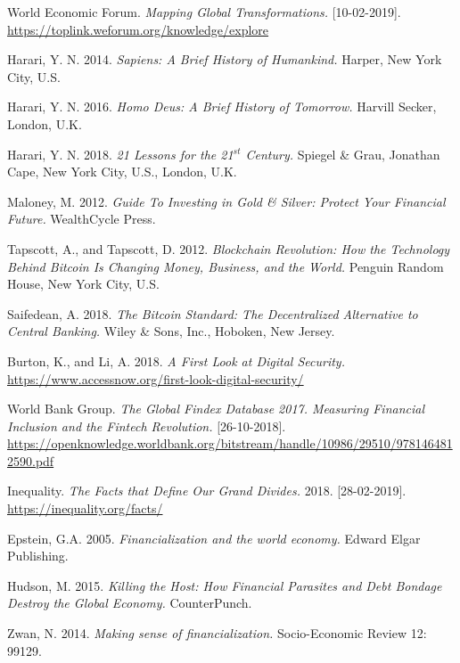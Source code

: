 \begin{thebibliography}{25}
World Economic Forum. \emph{Mapping Global Transformations.} [10-02-2019].\\ \url{https://toplink.weforum.org/knowledge/explore}

 Harari, Y. N. 2014. \emph{Sapiens: A Brief History of Humankind.} 
 Harper, New York City, U.S.

 Harari, Y. N. 2016. \emph{Homo Deus: A Brief History of Tomorrow.}
 Harvill Secker, London, U.K.

 Harari, Y. N. 2018. \emph{21 Lessons for the 21$^{st}$ Century.}
 Spiegel \& Grau, Jonathan Cape, New York City, U.S., London, U.K.

 Maloney, M. 2012. \emph{Guide To Investing in Gold \& Silver: Protect Your Financial Future.}
 WealthCycle Press.

 Tapscott, A., and Tapscott, D. 2012. \emph{Blockchain Revolution: How the Technology Behind Bitcoin Is Changing Money, Business, and the World.} Penguin Random House, New York City, U.S.

 Saifedean, A. 2018. \emph{The Bitcoin Standard: The Decentralized Alternative to Central Banking.}
 Wiley \& Sons, Inc., Hoboken, New Jersey.

Burton, K., and Li, A. 2018. \emph{A First Look at Digital Security.}\\ \url{https://www.accessnow.org/first-look-digital-security/}

World Bank Group. \emph{The Global Findex Database 2017. Measuring Financial Inclusion and the Fintech Revolution.} [26-10-2018].\\ \url{https://openknowledge.worldbank.org/bitstream/handle/10986/29510/9781464812590.pdf}

Inequality. \emph{The Facts that Define Our Grand Divides.} 2018. [28-02-2019].\\ \url{https://inequality.org/facts/}

Epstein, G.A. 2005. \emph{Financialization and the world economy.}  Edward Elgar Publishing. 

Hudson, M. 2015. \emph{Killing the Host: How Financial Parasites and Debt Bondage Destroy the Global Economy.} CounterPunch.

Zwan, N. 2014. \emph{Making sense of financialization.} Socio-Economic Review 12: 99129. 


\end{thebibliography}
